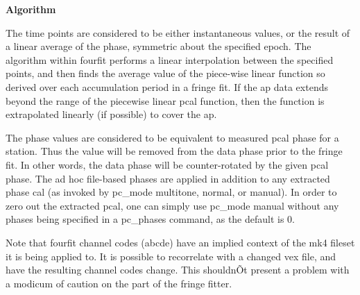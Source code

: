 {\bf Algorithm}

The time points are considered to be either instantaneous values, or the result of a linear average of the phase, symmetric about the specified epoch. The algorithm within fourfit performs a linear interpolation between the specified points, and then finds the average value of the piece-wise linear function so derived over each accumulation period in a fringe fit. If the ap data extends beyond the range of the piecewise linear pcal function, then the function is extrapolated linearly (if possible) to cover the ap.

The phase values are considered to be equivalent to measured pcal phase for a station. Thus the value will be removed from the data phase prior to the fringe fit. In other words, the data phase will be counter-rotated by the given pcal phase. The ad hoc file-based phases are applied in addition to any extracted phase cal (as invoked by pc\_mode multitone, normal, or manual). In order to zero out the
extracted pcal, one can simply use pc\_mode manual without any phases being specified in a pc\_phases command, as the default is 0.

Note that fourfit channel codes (abcde) have an implied context of the mk4 fileset it is being applied to. It is possible to recorrelate with a changed vex file, and have the resulting channel codes change. This shouldnÕt present a problem with a modicum of caution on the part of the fringe fitter.



